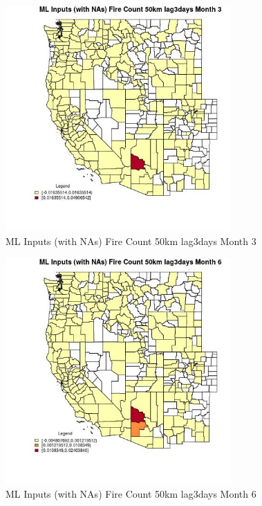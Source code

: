 \begin{figure} 
\centering  
\includegraphics[width=0.77\textwidth]{Code_Outputs/Report_ML_input_PM25_Step4_part_e_de_duplicated_aves_compiled_2019-05-20wNAs_CountyFire_Count_50km_lag3daysmedianMonth3.jpg} 
\caption{\label{fig:Report_ML_input_PM25_Step4_part_e_de_duplicated_aves_compiled_2019-05-20wNAsCountyFire_Count_50km_lag3daysmedianMonth3}ML Inputs (with NAs) Fire Count 50km lag3days Month 3} 
\end{figure} 
 

\begin{figure} 
\centering  
\includegraphics[width=0.77\textwidth]{Code_Outputs/Report_ML_input_PM25_Step4_part_e_de_duplicated_aves_compiled_2019-05-20wNAs_CountyFire_Count_50km_lag3daysmedianMonth6.jpg} 
\caption{\label{fig:Report_ML_input_PM25_Step4_part_e_de_duplicated_aves_compiled_2019-05-20wNAsCountyFire_Count_50km_lag3daysmedianMonth6}ML Inputs (with NAs) Fire Count 50km lag3days Month 6} 
\end{figure} 
 


